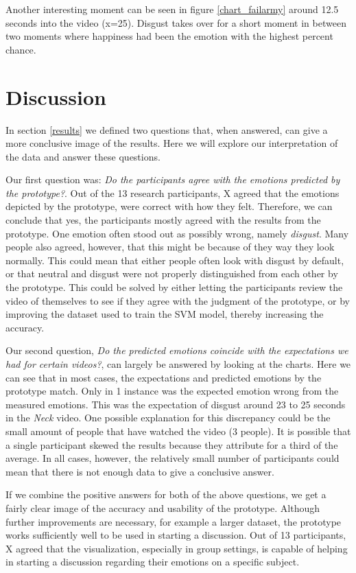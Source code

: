 \documentclass[sigconf]{acmart}
\begin{document}
Another interesting moment can be seen in figure \ref{chart_failarmy} around 12.5 seconds into the video (x=25).
Disgust takes over for a short moment in between two moments where happiness had been the emotion with the
highest percent chance.


\section{Discussion}
In section \ref{results} we defined two questions that, when answered, can give a more conclusive image of the
results. Here we will explore our interpretation of the data and answer these questions.

Our first question was: \emph{Do the participants agree with the emotions predicted by the prototype?}.
Out of the 13 research participants, X agreed that the emotions depicted by the prototype, were correct with
how they felt. Therefore, we can conclude that yes, the participants mostly agreed with the results from the
prototype. One emotion often stood out as possibly wrong, namely \emph{disgust}. Many people also agreed,
however, that this might be because of they way they look normally. This could mean that either people often
look with disgust by default, or that neutral and disgust were not properly distinguished from each other by
the prototype. This could be solved by either letting the participants review the video of themselves to see
if they agree with the judgment of the prototype, or by improving the dataset used to train the SVM model,
thereby increasing the accuracy.

Our second question, \emph{Do the predicted emotions coincide with the expectations we had for certain videos?},
can largely be answered by looking at the charts. Here we can see that in most cases, the expectations and
predicted emotions by the prototype match. Only in 1 instance was the expected emotion wrong from the measured
emotions. This was the expectation of disgust around 23 to 25 seconds in the \emph{Neck} video. One possible
explanation for this discrepancy could be the small amount of people that have watched the video (3 people). 
It is possible that a single participant skewed the results because they attribute for a third of the average.
In all cases, however, the relatively small number of participants could mean that there is not enough data to
give a conclusive answer.

If we combine the positive answers for both of the above questions, we get a fairly clear image of the accuracy
and usability of the prototype. Although further improvements are necessary, for example a larger dataset,
the prototype works sufficiently well to be used in starting a discussion. Out of 13 participants, X agreed that
the visualization, especially in group settings, is capable of helping in starting a discussion regarding their
emotions on a specific subject.
\end{document}
